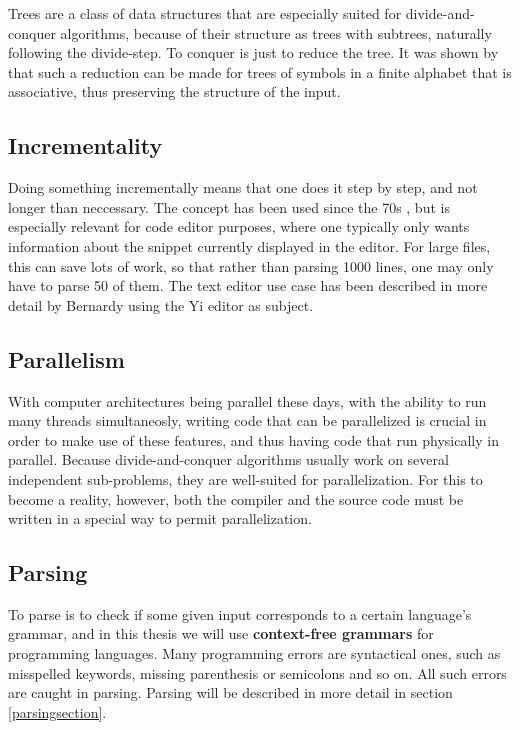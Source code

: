 \documentclass[a4paper,12pt,twosided]{report}
\renewcommand\cite{\citep}
\begin{document}
Trees are a class of data structures that are especially suited for 
divide-and-conquer algorithms, because of their structure as trees with
subtrees, naturally following the divide-step. To conquer is just to reduce the
tree. It was shown by \citet{parparsepaper} that such a reduction can be made
for trees of symbols in a finite alphabet that is associative, thus preserving
the structure of the input. 

\subsection{Incrementality}
Doing something incrementally means that one does it step by step, and not
longer than neccessary. The concept has been used since the 70s
\cite{incrementalpaper}, but is especially relevant for code editor purposes,
where one typically only wants information about the snippet currently displayed
in the editor. For large files, this can save lots of work, so that rather than
parsing 1000 lines, one may only have to parse 50 of them. The text editor use
case has been described in more detail by Bernardy \cite{lazyfunctional} using
the Yi editor as subject. 

\subsection{Parallelism}
With computer architectures being parallel these days, with the ability to run
many threads simultaneosly, writing code that can be parallelized is crucial in
order to make use of these features, and thus having code that run physically in
parallel. Because divide-and-conquer algorithms usually work on several
independent sub-problems, they are well-suited for parallelization. For this to
become a reality, however, both the compiler and the source code must be written
in a special way to permit parallelization.

\subsection{Parsing}
To parse is to check if some given input corresponds to a certain language's
grammar, and in this thesis we will use \textbf{context-free grammars} for
programming languages. Many programming errors are syntactical ones, such as
misspelled keywords, missing parenthesis or semicolons and so on. All such
errors are caught in parsing. Parsing will be described in more detail in
section \ref{parsingsection}.
\end{document}
